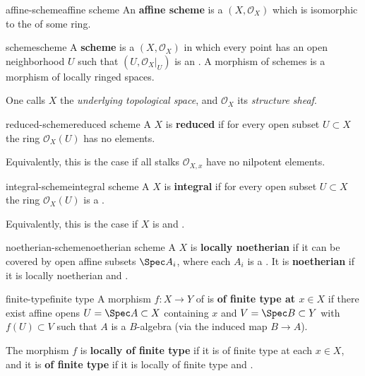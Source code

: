 \begin{topic}{affine-scheme}{affine scheme}
    An \textbf{affine scheme} is a  $(X, \mathcal{O}_X)$ which is isomorphic to the  of some ring.
\end{topic}

\begin{topic}{scheme}{scheme}
    A \textbf{scheme} is a  $(X, \mathcal{O}_X)$ in which every point has an open neighborhood $U$ such that $(U, \mathcal{O}_X|_U)$ is an . A morphism of schemes is a morphism of locally ringed spaces.
    
    One calls $X$ the \textit{underlying topological space}, and $\mathcal{O}_X$ its \textit{structure sheaf}.
\end{topic}

\begin{topic}{reduced-scheme}{reduced scheme}
    A  $X$ is \textbf{reduced} if for every open subset $U \subset X$ the ring $\mathcal{O}_X(U)$ has no  elements.
    
    Equivalently, this is the case if all stalks $\mathcal{O}_{X, x}$ have no nilpotent elements.
\end{topic}

\begin{topic}{integral-scheme}{integral scheme}
    A  $X$ is \textbf{integral} if for every open subset $U \subset X$ the ring $\mathcal{O}_X(U)$ is a .
    
    Equivalently, this is the case if $X$ is  and .
\end{topic}

\begin{topic}{noetherian-scheme}{noetherian scheme}
    A  $X$ is \textbf{locally noetherian} if it can be covered by open affine subsets $\Spec A_i$, where each $A_i$ is a . It is \textbf{noetherian} if it is locally noetherian and .
\end{topic}

\begin{topic}{finite-type}{finite type}
    A morphism $f : X \to Y$ of  is \textbf{of finite type at $x \in X$} if there exist affine opens $U = \Spec A \subset X$ containing $x$ and $V = \Spec B \subset Y$ with $f(U) \subset V$ such that $A$ is a  $B$-algebra (via the induced map $B \to A$).
    
    The morphism $f$ is \textbf{locally of finite type} if it is of finite type at each $x \in X$, and it is \textbf{of finite type} if it is locally of finite type and .
\end{topic}

